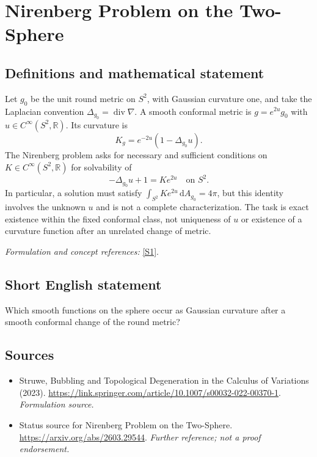 \documentclass[11pt]{article}
\begin{document}
\section*{\texorpdfstring{Nirenberg Problem on the Two-Sphere}{Nirenberg Problem on the Two-Sphere}}\label{328}
\subsection{Definitions and mathematical statement}
Let $g_0$ be the unit round metric on $S^2$, with Gaussian curvature one, and take the Laplacian convention $\Delta_{g_0}=\operatorname{div}\nabla$. A smooth conformal metric is $g=e^{2u}g_0$ with $u\in C^\infty(S^2,{\mathbb{R}})$. Its curvature is
\[
 K_g=e^{-2u}(1-\Delta_{g_0}u).
\]
The Nirenberg problem asks for necessary and sufficient conditions on $K\in C^\infty(S^2,{\mathbb{R}})$ for solvability of
\[
 -\Delta_{g_0}u+1=K e^{2u}\quad\text{on }S^2.
\]
In particular, a solution must satisfy $\int_{S^2}K e^{2u}{\,\mathrm{d}} A_{g_0}=4\pi$, but this identity involves the unknown $u$ and is not a complete characterization. The task is exact existence within the fixed conformal class, not uniqueness of $u$ or existence of a curvature function after an unrelated change of metric.
\par\smallskip\textit{Formulation and concept references:} \href{https://link.springer.com/article/10.1007/s00032-022-00370-1}{[S1]}.

\subsection{Short English statement}
Which smooth functions on the sphere occur as Gaussian curvature after a smooth conformal change of the round metric?
\subsection{Sources}
\begin{itemize}
\item[S1]Struwe, Bubbling and Topological Degeneration in the Calculus of Variations (2023).
\url{https://link.springer.com/article/10.1007/s00032-022-00370-1}.
\textit{Formulation source.}
\item[S2]Status source for Nirenberg Problem on the Two-Sphere.
\url{https://arxiv.org/abs/2603.29544}.
\textit{Further reference; not a proof endorsement.}
\end{itemize}
\end{document}
